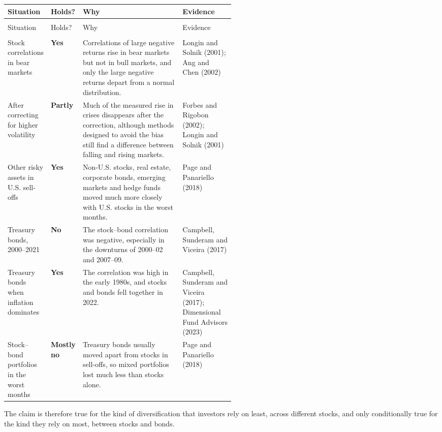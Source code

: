 {\small
\begin{longtable}{@{}>{\raggedright\arraybackslash}p{0.19\linewidth}>{\raggedright\arraybackslash}p{0.10\linewidth}>{\raggedright\arraybackslash}p{}>{\raggedright\arraybackslash}p{0.23\linewidth}@{}}
\toprule
Situation & Holds? & Why & Evidence \\
\midrule
\endfirsthead
\multicolumn{4}{@{}l}{\emph{(continued)}} \\
\toprule
Situation & Holds? & Why & Evidence \\
\midrule
\endhead
\midrule
\multicolumn{4}{r@{}}{\emph{(continued on the next page)}} \\
\endfoot
\bottomrule
\endlastfoot
Stock correlations in bear markets & \textbf{Yes} & Correlations of large negative returns rise in bear markets but not in bull markets, and only the large negative returns depart from a normal distribution. & Longin and Solnik (2001); Ang and Chen (2002) \\
\addlinespace[3pt]
After correcting for higher volatility & \textbf{Partly} & Much of the measured rise in crises disappears after the correction, although methods designed to avoid the bias still find a difference between falling and rising markets. & Forbes and Rigobon (2002); Longin and Solnik (2001) \\
\addlinespace[3pt]
Other risky assets in U.S. sell-offs & \textbf{Yes} & Non-U.S. stocks, real estate, corporate bonds, emerging markets and hedge funds moved much more closely with U.S. stocks in the worst months. & Page and Panariello (2018) \\
\addlinespace[3pt]
Treasury bonds, 2000--2021 & \textbf{No} & The stock--bond correlation was negative, especially in the downturns of 2000--02 and 2007--09. & Campbell, Sunderam and Viceira (2017) \\
\addlinespace[3pt]
Treasury bonds when inflation dominates & \textbf{Yes} & The correlation was high in the early 1980s, and stocks and bonds fell together in 2022. & Campbell, Sunderam and Viceira (2017); Dimensional Fund Advisors (2023) \\
\addlinespace[3pt]
Stock--bond portfolios in the worst months & \textbf{Mostly no} & Treasury bonds usually moved apart from stocks in sell-offs, so mixed portfolios lost much less than stocks alone. & Page and Panariello (2018) \\
\end{longtable}
}

The claim is therefore true for the kind of diversification that investors rely on least, across different stocks, and only conditionally true for the kind they rely on most, between stocks and bonds.

